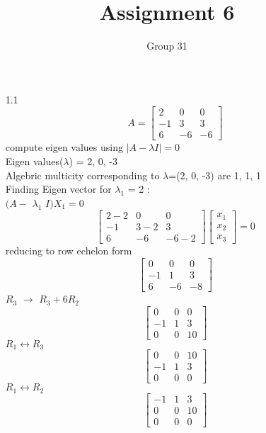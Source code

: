 \documentclass[12pt]{article}
\title{Assignment 6}
\author{Group 31}
\begin{document}
\maketitle

\subsection*{}
\begin{enumerate}[label=\alph*)]
\item[1.1]
\[
A = \begin{bmatrix} 2 & 0 & 0\\-1 & 3 & 3\\6 & -6 & -6 \end{bmatrix}
\]
compute eigen values using $|A - $$\lambda$$I| = 0$\\
Eigen values($\lambda$) = 2, 0, -3\\
Algebric multicity corresponding to $\lambda$=(2, 0, -3) are 1, 1, 1\\
Finding Eigen vector for $\lambda_{1}$ = 2 :\\
$(A-$ $\lambda_{1}$ $I)X_{1} = 0$
\[
\begin{bmatrix} 2-2 & 0 & 0\\-1 & 3-2 & 3\\6 & -6 & -6-2\end{bmatrix}\begin{bmatrix} x_{1}\\x_{2}\\x_{3}\end{bmatrix} = 0\]
reducing to row echelon form
\[
\begin{bmatrix} 0 & 0 & 0\\-1 & 1 & 3\\6 & -6 & -8\end{bmatrix}
\]
$R_{3}$ $\rightarrow$ $R_{3} + 6R_{2}$
\[
\begin{bmatrix} 0 & 0 & 0\\-1 & 1 & 3\\0 & 0 & 10\end{bmatrix}
\]
$R_{1}$$\leftrightarrow$$R_{3}$
\[
\begin{bmatrix} 0 & 0 & 10\\-1 & 1 & 3\\0 & 0 & 0\end{bmatrix}
\]
$R_{1}$$\leftrightarrow$$R_{2}$
\[
\begin{bmatrix} -1 & 1 & 3\\0 & 0 & 10\\0 & 0 & 0\end{bmatrix}
\]
\end{enumerate}
\end{document}
